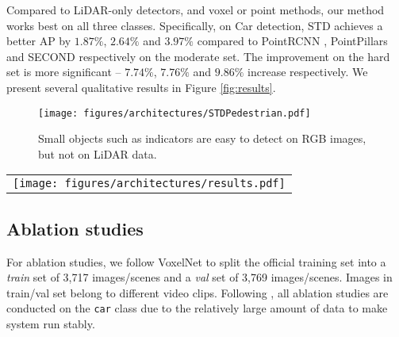 \documentclass[10pt,twocolumn,letterpaper]{article}
\begin{document}
Compared to LiDAR-only detectors, and voxel or point methods, our method works best on all three classes. Specifically, on Car detection, STD achieves a better AP by $1.87 \%$, $2.64 \%$ and $3.97 \%$ compared to PointRCNN \cite{shi2018pointrcnn}, PointPillars \cite{lang2018pointpillars} and SECOND \cite{yan2018second} respectively on the moderate set. The improvement on the hard set is more significant -- $7.74 \%$, $7.76 \%$ and $9.86 \%$ increase respectively. We present several qualitative results in Figure \ref{fig:results}.


\begin{figure}[bpt]
	\centering
	\texttt{[image: figures/architectures/STDPedestrian.pdf]}
	\caption{Small objects such as indicators are easy to detect on RGB images, but not on LiDAR data.}
	\label{fig:inferior_pedestrian}
\end{figure}

\begin{figure*}[t]
	\centering
	\begin{tabular}{@{\hspace{0mm}}c}
		\texttt{[image: figures/architectures/results.pdf]}\\
	\end{tabular}
	\caption{Visualization of our results on KITTI test set. Cars, pedestrians and cyclists are highlighted in yellow, red and green respectively. The upper row in each image is the 3D object detection result projected onto the RGB image. The other is the result in the LiDAR phase.}
	\label{fig:results}
\end{figure*}




\subsection{Ablation studies}
For ablation studies, we follow VoxelNet \cite{VOXELNET} to split the official training set into a {\it train} set of 3,717 images/scenes and a {\it val} set of 3,769 images/scenes. Images in train/val set belong to different video clips. Following \cite{VOXELNET}, all ablation studies are conducted on the {\tt car} class due to the relatively large amount of data to make system run stably.
\end{document}

